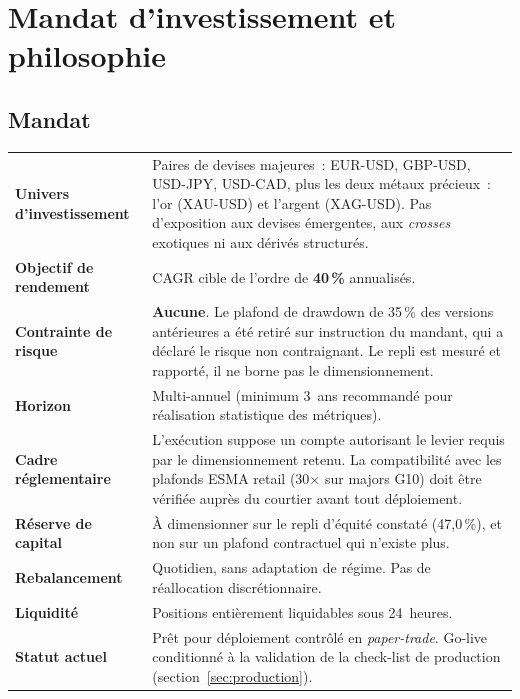 \section{Mandat d'investissement et philosophie}
\label{sec:mandate}

\subsection{Mandat}

\begin{center}
\renewcommand{\arraystretch}{1.35}
\begin{tabular}{p{4.2cm}p{10cm}}
\toprule
\textbf{Univers d'investissement} & Paires de devises majeures~: EUR-USD, GBP-USD, USD-JPY, USD-CAD, plus les deux métaux précieux~: l'or (XAU-USD) et l'argent (XAG-USD). Pas d'exposition aux devises émergentes, aux \emph{crosses} exotiques ni aux dérivés structurés. \\
\textbf{Objectif de rendement} & CAGR cible de l'ordre de \textbf{40\,\%} annualisés. \\
\textbf{Contrainte de risque} & \textbf{Aucune}. Le plafond de drawdown de 35\,\% des versions antérieures a été retiré sur instruction du mandant, qui a déclaré le risque non contraignant. Le repli est mesuré et rapporté, il ne borne pas le dimensionnement. \\
\textbf{Horizon} & Multi-annuel (minimum 3~ans recommandé pour réalisation statistique des métriques). \\
\textbf{Cadre réglementaire} & L'exécution suppose un compte autorisant le levier requis par le dimensionnement retenu. La compatibilité avec les plafonds ESMA retail (30$\times$ sur majors G10) doit être vérifiée auprès du courtier avant tout déploiement. \\
\textbf{Réserve de capital} & À dimensionner sur le repli d'équité constaté (47,0\,\%), et non sur un plafond contractuel qui n'existe plus. \\
\textbf{Rebalancement} & Quotidien, sans adaptation de régime. Pas de réallocation discrétionnaire. \\
\textbf{Liquidité} & Positions entièrement liquidables sous 24~heures. \\
\textbf{Statut actuel} & Prêt pour déploiement contrôlé en \emph{paper-trade}. Go-live conditionné à la validation de la check-list de production (section~\ref{sec:production}). \\
\bottomrule
\end{tabular}
\end{center}

